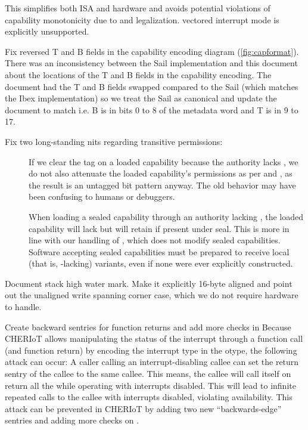 \begin{description}
\begin{description}
    This simplifies both ISA and hardware and avoids potential violations of capability monotonicity due to  and  legalization.
    vectored interrupt mode is explicitly unsupported.
    \item[\ghpr{38}] Fix reversed T and B fields in the capability encoding diagram (\cref{fig:capformat}).
    There was an inconsistency between the Sail implementation and this document about the locations of the T and B fields in the capability encoding.
    The document had the T and B fields swapped compared to the Sail (which matches the Ibex implementation) so we treat the Sail as canonical and update the document to match i.e. B is in bits 0 to 8 of the metadata word and T is in 9 to 17.
    \item[\ghpr{44}] Fix two long-standing nits regarding transitive permissions:
      \begin{description}
        \item[] If we clear the tag on a loaded capability because the authority lacks \cappermMC,
          we do not also attenuate the loaded capability's permissions as per \cappermILG and \cappermLM,
          as the result is an untagged bit pattern anyway.
          The old behavior may have been confusing to humans or debuggers.
        \item[] When loading a sealed capability through an authority lacking \cappermILG,
          the loaded capability will lack \cappermG but will retain \cappermILG if present under seal.
          This is more in line with our handling of \cappermLM, which does not modify sealed capabilities.
          Software accepting sealed capabilities must be prepared to receive local (that is, \cappermG-lacking) variants,
          even if none were ever explicitly constructed.
      \end{description}
    \item[\ghissue{15}, \ghpr{49}] Document stack high water mark.
    Make it explicitly 16-byte aligned and point out the unaligned write spanning \mshwmb{} corner case, which we do not require hardware to handle.
    \item[\ghpr{54}] Create backward sentries for function returns and add more checks in 
    Because CHERIoT allows manipulating the status of the interrupt through a function call (and function return) by encoding the interrupt type in the otype, the following attack can occur: A caller calling an interrupt-disabling callee can set the return sentry of the callee to the same callee. This means, the callee will call itself on return all the while operating with interrupts disabled. This will lead to infinite repeated calls to the callee with interrupts disabled, violating availability. This attack can be prevented in CHERIoT by adding two new ``backwards-edge'' sentries and adding more checks on .

\end{description}
\end{description}

